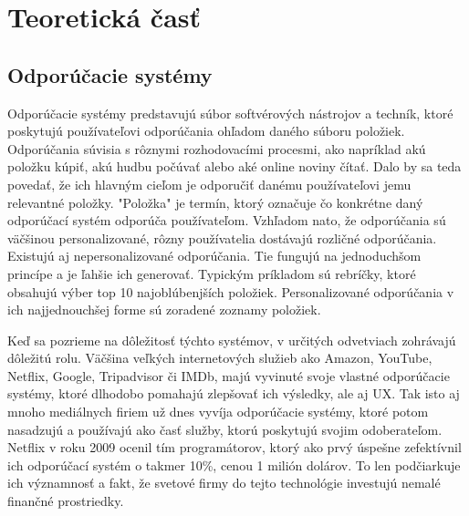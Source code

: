 \section{Teoretická časť}

\subsection{Odporúčacie systémy}
\label{sec:odporucacie systemy}
 Odporúčacie systémy predstavujú súbor softvérových nástrojov a techník, ktoré poskytujú používateľovi odporúčania ohľadom daného súboru položiek. Odporúčania súvisia s rôznymi rozhodovacími procesmi, ako napríklad akú položku kúpiť, akú hudbu počúvať alebo aké online noviny  čítať. \cite{rs1} Dalo by sa teda povedať, že ich hlavným cieľom je odporučiť danému používateľovi jemu relevantné položky. "Položka" je termín, ktorý označuje čo konkrétne daný odporúčací systém odporúča používateľom. Vzhľadom nato, že odporúčania sú väčšinou personalizované, rôzny používatelia dostávajú rozličné odporúčania. Existujú aj nepersonalizované odporúčania. Tie fungujú na jednoduchšom princípe a je ľahšie ich generovať. Typickým príkladom sú rebríčky, ktoré obsahujú výber top 10 najoblúbenjších položiek. Personalizované odporúčania v ich najjednouchšej forme sú zoradené zoznamy položiek.
 
Keď sa pozrieme na dôležitosť týchto systémov, v určitých odvetviach zohrávajú dôležitú rolu. Väčšina veľkých internetových služieb ako Amazon, YouTube, Netflix, Google, Tripadvisor či IMDb, majú vyvinuté svoje vlastné odporúčacie systémy, ktoré dlhodobo pomahajú zlepšovať ich výsledky, ale aj UX. Tak isto aj mnoho mediálnych firiem už dnes vyvíja odporúčacie systémy, ktoré potom nasadzujú a používajú ako časť služby, ktorú poskytujú svojim odoberateľom. Netflix v roku 2009 ocenil tím programátorov, ktorý ako prvý úspešne zefektívnil ich odporúčací systém o takmer 10\%, cenou 1 milión dolárov. To len podčiarkuje ich významnosť a fakt, že svetové firmy do tejto technológie investujú nemalé finančné prostriedky.  \\

